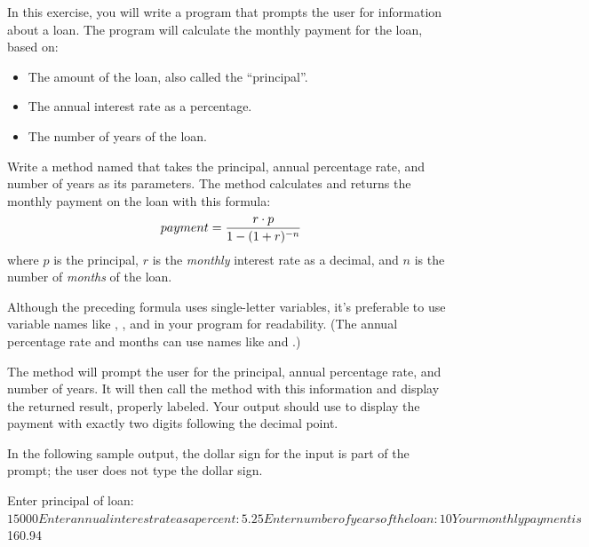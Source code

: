 \begin{exercise}
In this exercise, you will write a program that prompts the user for information about a loan. The program will calculate the monthly payment for the loan, based on:
\begin{itemize}
\item The amount of the loan, also called the ``principal''.
\item The annual interest rate as a percentage.
\item The number of years of the loan.
\end{itemize}

Write a method named  that takes the principal, annual percentage rate, and number of years as its parameters. The method calculates and returns the monthly payment on the loan with this formula:
\begin{equation*}
payment = {{r\cdot p}\over {1-(1+r)^{-n}}}
\end{equation*}
where $p$ is the principal, $r$ is the {\em monthly} interest rate as a decimal, and $n$ is the number of {\em months} of the loan.

Although the preceding formula uses single-letter variables, it's preferable to use variable names like , , and  in your program for readability. (The annual percentage rate and months can use names like  and .)

The  method will prompt the user for the principal, annual percentage rate, and number of years. It will then call the  method with this information and display the returned result, properly labeled. Your output should use  to display the payment with exactly two digits following the decimal point.

In the following sample output, the dollar sign for the input is part of the prompt; the user does not type the dollar sign.

\begin{stdout}
Enter principal of loan: $15000
Enter annual interest rate as a percent: 5.25
Enter number of years of the loan: 10
Your monthly payment is $160.94
\end{stdout}

\end{exercise}


